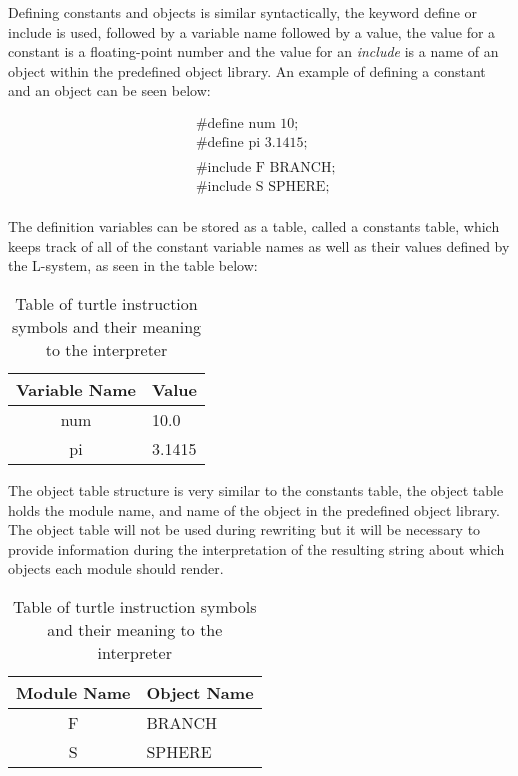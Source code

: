 Defining constants and objects is similar syntactically, the keyword define or include is used, followed by a variable name followed by a value, the value for a constant is a floating-point number and the value for an \textit{include} is a name of an object within the predefined object library. An example of defining a constant and an object can be seen below: 

\begin{equation} \label{constant and object example}
\begin{aligned}
	&\text{\#define num 10;}\\
	&\text{\#define pi 3.1415;}\\
	&\\
	&\text{\#include F BRANCH;}\\
	&\text{\#include S SPHERE;}\\
\end{aligned}
\end{equation}

\noindent
The definition variables can be stored as a table, called a constants table, which keeps track of all of the constant variable names as well as their values defined by the L-system, as seen in the table below: 

\begin{table}[h!] \center
\begin{tabular}{ | c | l | }
\hline
	Variable Name 	& Value\\  
\hline
\hline
	num 				& 10.0\\
\hline
	pi					& 3.1415\\
\hline
\end{tabular}
\caption{Table of turtle instruction symbols and their meaning to the interpreter}
\label{constants table}
\end{table}
\FloatBarrier

\noindent
The object table structure is very similar to the constants table, the object table holds the module name, and name of the object in the predefined object library. The object table will not be used during rewriting but it will be necessary to provide information during the interpretation of the resulting string about which objects each module should render. 

\begin{table}[h!] \center
\begin{tabular}{ | c | l | }
\hline
	Module Name	& Object Name\\  
\hline
\hline
	F 				& BRANCH\\
\hline
	S				& SPHERE\\
\hline
\end{tabular}
\caption{Table of turtle instruction symbols and their meaning to the interpreter}
\label{constants table}
\end{table}
\FloatBarrier

